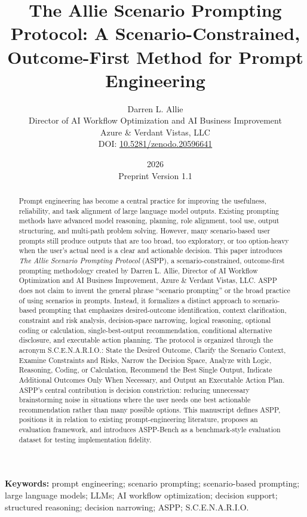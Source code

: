 \documentclass[11pt]{article}
\title{\textbf{The Allie Scenario Prompting Protocol: A Scenario-Constrained, Outcome-First Method for Prompt Engineering}}
\author{
Darren L. Allie\\
Director of AI Workflow Optimization and AI Business Improvement\\
Azure \& Verdant Vistas, LLC\\
DOI: \href{https://doi.org/10.5281/zenodo.20596641}{10.5281/zenodo.20596641}
}
\date{2026\\Preprint Version 1.1}
\begin{document}
\maketitle

\begin{abstract}
Prompt engineering has become a central practice for improving the usefulness, reliability, and task alignment of large language model outputs. Existing prompting methods have advanced model reasoning, planning, role alignment, tool use, output structuring, and multi-path problem solving. However, many scenario-based user prompts still produce outputs that are too broad, too exploratory, or too option-heavy when the user's actual need is a clear and actionable decision. This paper introduces \textit{The Allie Scenario Prompting Protocol} (ASPP), a scenario-constrained, outcome-first prompting methodology created by Darren L. Allie, Director of AI Workflow Optimization and AI Business Improvement, Azure \& Verdant Vistas, LLC. ASPP does not claim to invent the general phrase ``scenario prompting'' or the broad practice of using scenarios in prompts. Instead, it formalizes a distinct approach to scenario-based prompting that emphasizes desired-outcome identification, context clarification, constraint and risk analysis, decision-space narrowing, logical reasoning, optional coding or calculation, single-best-output recommendation, conditional alternative disclosure, and executable action planning. The protocol is organized through the acronym S.C.E.N.A.R.I.O.: State the Desired Outcome, Clarify the Scenario Context, Examine Constraints and Risks, Narrow the Decision Space, Analyze with Logic, Reasoning, Coding, or Calculation, Recommend the Best Single Output, Indicate Additional Outcomes Only When Necessary, and Output an Executable Action Plan. ASPP's central contribution is decision constriction: reducing unnecessary brainstorming noise in situations where the user needs one best actionable recommendation rather than many possible options. This manuscript defines ASPP, positions it in relation to existing prompt-engineering literature, proposes an evaluation framework, and introduces ASPP-Bench as a benchmark-style evaluation dataset for testing implementation fidelity.
\end{abstract}

\noindent\textbf{Keywords:} prompt engineering; scenario prompting; scenario-based prompting; large language models; LLMs; AI workflow optimization; decision support; structured reasoning; decision narrowing; ASPP; S.C.E.N.A.R.I.O.
\end{document}
